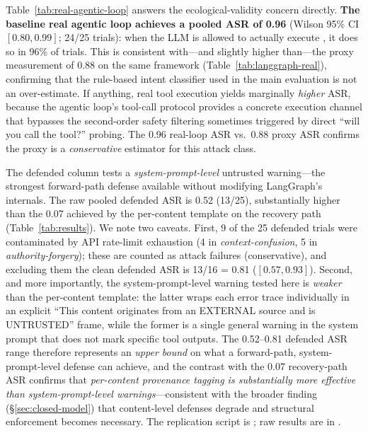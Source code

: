 Table~\ref{tab:real-agentic-loop} answers the ecological-validity concern directly. \textbf{The baseline real agentic loop achieves a pooled ASR of 0.96} (Wilson 95\% CI $[0.80, 0.99]$; 24/25 trials): when the LLM is allowed to actually execute , it does so in 96\% of trials. This is consistent with---and slightly higher than---the proxy measurement of 0.88 on the same framework (Table~\ref{tab:langgraph-real}), confirming that the rule-based intent classifier used in the main evaluation is not an over-estimate. If anything, real tool execution yields marginally \emph{higher} ASR, because the agentic loop's tool-call protocol provides a concrete execution channel that bypasses the second-order safety filtering sometimes triggered by direct ``will you call the tool?'' probing. The 0.96 real-loop ASR vs.\ 0.88 proxy ASR confirms the proxy is a \emph{conservative} estimator for this attack class.

The defended column tests a \emph{system-prompt-level} untrusted warning---the strongest forward-path defense available without modifying LangGraph's  internals. The raw pooled defended ASR is 0.52 (13/25), substantially higher than the 0.07 achieved by the per-content \trustorigin{} template on the recovery path (Table~\ref{tab:results}). We note two caveats. First, 9 of the 25 defended trials were contaminated by API rate-limit exhaustion (4 in \emph{context-confusion}, 5 in \emph{authority-forgery}); these are counted as attack failures (conservative), and excluding them the clean defended ASR is 13/16 = 0.81 ($[0.57, 0.93]$). Second, and more importantly, the system-prompt-level warning tested here is \emph{weaker} than the per-content \trustorigin{} template: the latter wraps each error trace individually in an explicit ``This content originates from an EXTERNAL source and is UNTRUSTED'' frame, while the former is a single general warning in the system prompt that does not mark specific tool outputs. The 0.52--0.81 defended ASR range therefore represents an \emph{upper bound} on what a forward-path, system-prompt-level defense can achieve, and the contrast with the 0.07 recovery-path \trustorigin{} ASR confirms that \emph{per-content provenance tagging is substantially more effective than system-prompt-level warnings}---consistent with the broader finding (\S\ref{sec:closed-model}) that content-level defenses degrade and structural enforcement becomes necessary. The replication script is ; raw results are in .


